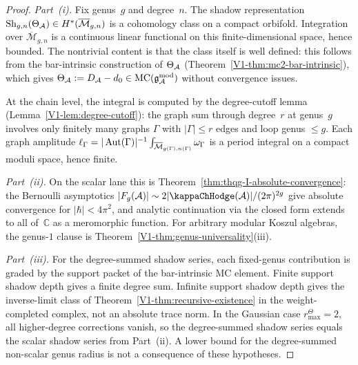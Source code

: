 \begin{proof}
\emph{Part~(i).} Fix genus~$g$ and degree~$n$. The shadow representation $\operatorname{Sh}_{g,n}(\Theta_{\mathcal{A}}) \in H^*(\overline{\mathcal{M}}_{g,n})$ is a cohomology class on a compact orbifold. Integration over $\overline{\mathcal{M}}_{g,n}$ is a continuous linear functional on this finite-dimensional space, hence bounded. The nontrivial content is that the class itself is well defined: this follows from the bar-intrinsic construction of $\Theta_{\mathcal{A}}$ (Theorem~\ref*{V1-thm:mc2-bar-intrinsic}), which gives $\Theta_{\mathcal{A}} := D_{\mathcal{A}} - d_0 \in \mathrm{MC}(\mathfrak{g}_{\mathcal{A}}^{\mathrm{mod}})$ without convergence issues.

At the chain level, the integral is computed by the degree-cutoff lemma (Lemma~\ref{V1-lem:degree-cutoff}): the graph sum through degree~$r$ at genus~$g$ involves only finitely many graphs $\Gamma$ with $|\Gamma| \leq r$ edges and loop genus $\leq g$. Each graph amplitude $\ell_\Gamma = |\operatorname{Aut}(\Gamma)|^{-1} \int_{\overline{\mathcal{M}}_{g(\Gamma),n(\Gamma)}} \omega_\Gamma$ is a period integral on a compact moduli space, hence finite.

\emph{Part~(ii).} On the scalar lane this is
Theorem~\ref{thm:thqg-I-absolute-convergence}: the Bernoulli
asymptotics $|F_g(\cA)| \sim 2|\kappaChHodge(\cA)|/(2\pi)^{2g}$ give absolute
convergence for $|\hbar| < 4\pi^2$, and analytic continuation via the
closed form extends to all of~$\mathbb{C}$ as a meromorphic function.
For arbitrary modular Koszul algebras, the genus-$1$ clause is
Theorem~\ref{V1-thm:genus-universality}\textup{(iii)}.

\emph{Part~(iii).} For the degree-summed shadow series, each
fixed-genus contribution is graded by the support packet of the
bar-intrinsic MC element.
Finite support shadow depth gives a finite degree sum. Infinite support
shadow depth gives the
inverse-limit class of Theorem~\ref{V1-thm:recursive-existence} in the
weight-completed complex, not an absolute trace norm. In the Gaussian
case \(r^\Theta_{\max}=2\), all higher-degree corrections vanish, so the
degree-summed shadow series equals the scalar shadow series from
Part~(ii). A lower bound for the degree-summed non-scalar genus radius
is not a consequence of these hypotheses.


\end{proof}
